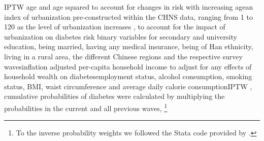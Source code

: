 \textit{} \ac{IPTW} \DIFaddend age and age squared to account for changes in risk with increasing age\DIFdelbegin \DIFdel{, }\DIFdelend \DIFaddbegin \DIFadd{; }\DIFaddend an index of urbanization pre-constructed within the \ac{CHNS} data, ranging from 1 to 120 as the level of urbanization increases \parencite{Zhang2014d}, to account for the impact of urbanization on diabetes risk \parencite{Attard2012}\DIFdelbegin {}\DIFdelend \DIFaddbegin \DIFadd{; }\DIFaddend binary variables for secondary and university education, being married, having any medical insurance, being of Han ethnicity, living in a rural area, the different Chinese regions and the respective survey waves\DIFdelbegin {}\DIFdelend \DIFaddbegin \DIFadd{; }\DIFaddend inflation adjusted per-capita household income to adjust for any effects of household wealth on diabetes\DIFdelbegin {}\DIFdelend \DIFaddbegin {}\DIFaddend employment status, alcohol consumption, smoking status, \ac{BMI}, waist circumference and average daily calorie consumption\DIFdelbegin {}\DIFdelend \DIFaddbegin {}\ac{IPTW} \DIFaddend , cumulative probabilities of diabetes were calculated by multiplying the \DIFaddbegin {}\DIFaddend probabilities in the current and all previous waves, \DIFdelbegin {}\DIFdelend \DIFaddbegin {}\DIFaddend \footnote{To \DIFdelbegin {}\DIFdelend \DIFaddbegin {}\DIFaddend the inverse probability weights we followed the Stata code provided by \textcite{Fewell2004}.}


